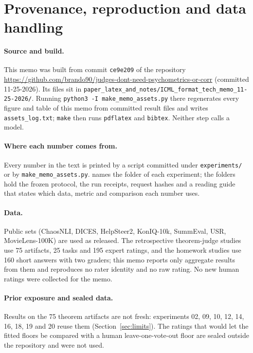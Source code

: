 \section{Provenance, reproduction and data handling}
\label{app:provenance}

\paragraph{Source and build.}
This memo was built from commit \texttt{ce9e209} of the repository \url{https://github.com/brando90/judges-dont-need-psychometrics-or-corr} (committed 11-25-2026).
Its files sit in \texttt{paper\_latex\_and\_notes/ICML\_format\_tech\_memo\_11-25-2026/}.
Running \texttt{python3 -I make\_memo\_assets.py} there regenerates every figure and table of this memo from committed result files and writes \texttt{assets\_log.txt}; \texttt{make} then runs \texttt{pdflatex} and \texttt{bibtex}.
Neither step calls a model.

\paragraph{Where each number comes from.}
Every number in the text is printed by a script committed under \texttt{experiments/} or by \texttt{make\_memo\_assets.py}.
 names the folder of each experiment; the folders hold the frozen protocol, the run receipts, request hashes and a reading guide that states which data, metric and comparison each number uses.

\paragraph{Data.}
Public sets (ChaosNLI, DICES, HelpSteer2, KonIQ-10k, SummEval, USR, MovieLens-100K) are used as released.
The retrospective theorem-judge studies use 75 artifacts, 25 tasks and 195 expert ratings, and the homework studies use 160 short answers with two graders; this memo reports only aggregate results from them and reproduces no rater identity and no raw rating.
No new human ratings were collected for the memo.

\paragraph{Prior exposure and sealed data.}
Results on the 75 theorem artifacts are not fresh: experiments 02, 09, 10, 12, 14, 16, 18, 19 and 20 reuse them (Section~\ref{sec:limits}).
The ratings that would let the fitted floors be compared with a human leave-one-vote-out floor are sealed outside the repository and were not used.

